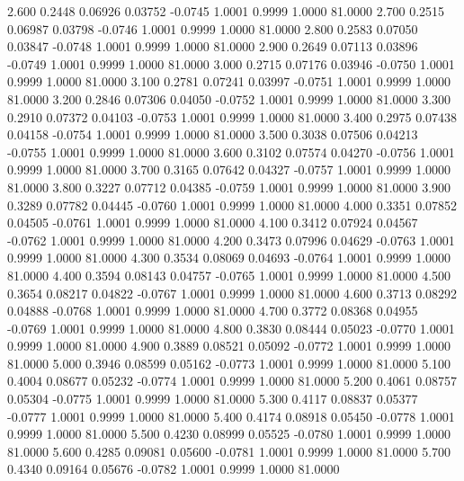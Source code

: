    2.600   0.2448   0.06926   0.03752  -0.0745   1.0001   0.9999   1.0000  81.0000
   2.700   0.2515   0.06987   0.03798  -0.0746   1.0001   0.9999   1.0000  81.0000
   2.800   0.2583   0.07050   0.03847  -0.0748   1.0001   0.9999   1.0000  81.0000
   2.900   0.2649   0.07113   0.03896  -0.0749   1.0001   0.9999   1.0000  81.0000
   3.000   0.2715   0.07176   0.03946  -0.0750   1.0001   0.9999   1.0000  81.0000
   3.100   0.2781   0.07241   0.03997  -0.0751   1.0001   0.9999   1.0000  81.0000
   3.200   0.2846   0.07306   0.04050  -0.0752   1.0001   0.9999   1.0000  81.0000
   3.300   0.2910   0.07372   0.04103  -0.0753   1.0001   0.9999   1.0000  81.0000
   3.400   0.2975   0.07438   0.04158  -0.0754   1.0001   0.9999   1.0000  81.0000
   3.500   0.3038   0.07506   0.04213  -0.0755   1.0001   0.9999   1.0000  81.0000
   3.600   0.3102   0.07574   0.04270  -0.0756   1.0001   0.9999   1.0000  81.0000
   3.700   0.3165   0.07642   0.04327  -0.0757   1.0001   0.9999   1.0000  81.0000
   3.800   0.3227   0.07712   0.04385  -0.0759   1.0001   0.9999   1.0000  81.0000
   3.900   0.3289   0.07782   0.04445  -0.0760   1.0001   0.9999   1.0000  81.0000
   4.000   0.3351   0.07852   0.04505  -0.0761   1.0001   0.9999   1.0000  81.0000
   4.100   0.3412   0.07924   0.04567  -0.0762   1.0001   0.9999   1.0000  81.0000
   4.200   0.3473   0.07996   0.04629  -0.0763   1.0001   0.9999   1.0000  81.0000
   4.300   0.3534   0.08069   0.04693  -0.0764   1.0001   0.9999   1.0000  81.0000
   4.400   0.3594   0.08143   0.04757  -0.0765   1.0001   0.9999   1.0000  81.0000
   4.500   0.3654   0.08217   0.04822  -0.0767   1.0001   0.9999   1.0000  81.0000
   4.600   0.3713   0.08292   0.04888  -0.0768   1.0001   0.9999   1.0000  81.0000
   4.700   0.3772   0.08368   0.04955  -0.0769   1.0001   0.9999   1.0000  81.0000
   4.800   0.3830   0.08444   0.05023  -0.0770   1.0001   0.9999   1.0000  81.0000
   4.900   0.3889   0.08521   0.05092  -0.0772   1.0001   0.9999   1.0000  81.0000
   5.000   0.3946   0.08599   0.05162  -0.0773   1.0001   0.9999   1.0000  81.0000
   5.100   0.4004   0.08677   0.05232  -0.0774   1.0001   0.9999   1.0000  81.0000
   5.200   0.4061   0.08757   0.05304  -0.0775   1.0001   0.9999   1.0000  81.0000
   5.300   0.4117   0.08837   0.05377  -0.0777   1.0001   0.9999   1.0000  81.0000
   5.400   0.4174   0.08918   0.05450  -0.0778   1.0001   0.9999   1.0000  81.0000
   5.500   0.4230   0.08999   0.05525  -0.0780   1.0001   0.9999   1.0000  81.0000
   5.600   0.4285   0.09081   0.05600  -0.0781   1.0001   0.9999   1.0000  81.0000
   5.700   0.4340   0.09164   0.05676  -0.0782   1.0001   0.9999   1.0000  81.0000

